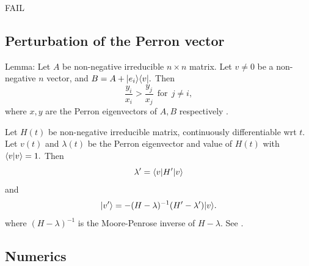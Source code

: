 \documentclass[12pt]{article}
\begin{document}
FAIL

%

\subsection{Perturbation of the Perron vector}

Lemma:
Let $A$ be non-negative irreducible $n\times n$ matrix.
Let $v\ne 0$ be a non-negative $n$ vector, and $B = A + |{e_i}\rangle\langle{v}|.$
Then 
$$
\frac{y_i}{x_i} > \frac{y_j}{x_j} \ \ \mbox{for}\ \ j \ne i,
$$
where $x, y$ are the Perron eigenvectors of $A, B$ respectively
\cite{Elsner1982}.

Let $H(t)$ be non-negative irreducible matrix, continuously
differentiable wrt $t.$
Let $v(t)$ and $\lambda(t)$ be the Perron eigenvector and value of $H(t)$
with $\langle{v}|{v}\rangle=1.$
Then
$$
    \lambda' = \langle{v}|H'|{v}\rangle
$$
and
$$
    |{v'}\rangle = -(H-\lambda)^{-1}(H' - \lambda')|{v}\rangle.
$$
where $(H-\lambda)^{-1}$ is the Moore-Penrose inverse of $H-\lambda.$ See \cite{Meyer1988}.



%

\subsection{Numerics}
\end{document}
